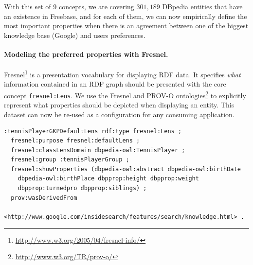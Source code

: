 \begin{table}[!htp]
\end{table}\normalsize

With this set of 9 concepts, we are covering $301,189$ DBpedia entities that have an existence in Freebase, and for each of them, we can now empirically define the most important properties when there is an agreement between one of the biggest knowledge base (Google) and users preferences.

\paragraph{Modeling the preferred properties with Fresnel.}
\label{sec:fresnel}
Fresnel\footnote{\url{http://www.w3.org/2005/04/fresnel-info/}} is a presentation vocabulary for displaying RDF data. It specifies \textit{what} information contained in an RDF graph should be presented with the core concept \texttt{fresnel:Lens}. We use the Fresnel and PROV-O ontologies\footnote{\url{http://www.w3.org/TR/prov-o/}} to explicitly represent what properties should be depicted when displaying an entity. This dataset can now be re-used as a configuration for any consuming application.

\begin{lstlisting}
:tennisPlayerGKPDefaultLens rdf:type fresnel:Lens ;
  fresnel:purpose fresnel:defaultLens ;
  fresnel:classLensDomain dbpedia-owl:TennisPlayer ;
  fresnel:group :tennisPlayerGroup ;
  fresnel:showProperties (dbpedia-owl:abstract dbpedia-owl:birthDate
    dbpedia-owl:birthPlace dbpprop:height dbpprop:weight
    dbpprop:turnedpro dbpprop:siblings) ;
  prov:wasDerivedFrom
    <http://www.google.com/insidesearch/features/search/knowledge.html> .	
\end{lstlisting}



